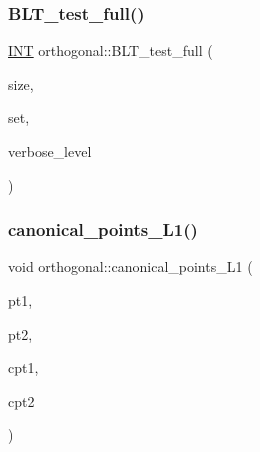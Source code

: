 \mbox{\label{classorthogonal_ab4c41d4de00851e2edc32108f30a9520}} 
\subsubsection{\texorpdfstring{B\+L\+T\+\_\+test\+\_\+full()}{BLT\_test\_full()}}
{\footnotesize\ttfamily \mbox{\hyperlink{galois_8h_a09fddde158a3a20bd2dcadb609de11dc}{I\+NT}} orthogonal\+::\+B\+L\+T\+\_\+test\+\_\+full (\begin{DoxyParamCaption}\item[{\mbox{\hyperlink{galois_8h_a09fddde158a3a20bd2dcadb609de11dc}{I\+NT}}}]{size,  }\item[{\mbox{\hyperlink{galois_8h_a09fddde158a3a20bd2dcadb609de11dc}{I\+NT}} $\ast$}]{set,  }\item[{\mbox{\hyperlink{galois_8h_a09fddde158a3a20bd2dcadb609de11dc}{I\+NT}}}]{verbose\+\_\+level }\end{DoxyParamCaption})}

\mbox{\label{classorthogonal_ad698a591f553b8f6c6aa69fcdcad382d}} 
\subsubsection{\texorpdfstring{canonical\+\_\+points\+\_\+\+L1()}{canonical\_points\_L1()}}
{\footnotesize\ttfamily void orthogonal\+::canonical\+\_\+points\+\_\+\+L1 (\begin{DoxyParamCaption}\item[{\mbox{\hyperlink{galois_8h_a09fddde158a3a20bd2dcadb609de11dc}{I\+NT}}}]{pt1,  }\item[{\mbox{\hyperlink{galois_8h_a09fddde158a3a20bd2dcadb609de11dc}{I\+NT}}}]{pt2,  }\item[{\mbox{\hyperlink{galois_8h_a09fddde158a3a20bd2dcadb609de11dc}{I\+NT}} \&}]{cpt1,  }\item[{\mbox{\hyperlink{galois_8h_a09fddde158a3a20bd2dcadb609de11dc}{I\+NT}} \&}]{cpt2 }\end{DoxyParamCaption})}

\mbox{\label{classorthogonal_a5fb45036337a662f0bc72c943a56cb80}} 
